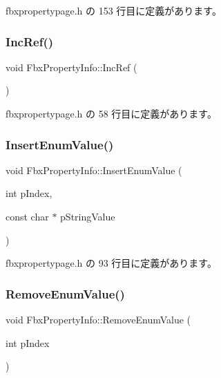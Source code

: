  fbxpropertypage.\+h の 153 行目に定義があります。

\mbox{\label{class_fbx_property_info_afa1a32d32b37e32e4b1ff4977b3ee9ab}} 
\subsubsection{\texorpdfstring{Inc\+Ref()}{IncRef()}}
{\footnotesize\ttfamily void Fbx\+Property\+Info\+::\+Inc\+Ref (\begin{DoxyParamCaption}{ }\end{DoxyParamCaption})\hspace{0.3cm}{\ttfamily [inline]}}



 fbxpropertypage.\+h の 58 行目に定義があります。

\mbox{\label{class_fbx_property_info_a65d9761825670a7b2a158685b10657d3}} 
\subsubsection{\texorpdfstring{Insert\+Enum\+Value()}{InsertEnumValue()}}
{\footnotesize\ttfamily void Fbx\+Property\+Info\+::\+Insert\+Enum\+Value (\begin{DoxyParamCaption}\item[{int}]{p\+Index,  }\item[{const char $\ast$}]{p\+String\+Value }\end{DoxyParamCaption})\hspace{0.3cm}{\ttfamily [inline]}}



 fbxpropertypage.\+h の 93 行目に定義があります。

\mbox{\label{class_fbx_property_info_ad76228d49b0ca38bc402f0e8fe2f3850}} 
\subsubsection{\texorpdfstring{Remove\+Enum\+Value()}{RemoveEnumValue()}}
{\footnotesize\ttfamily void Fbx\+Property\+Info\+::\+Remove\+Enum\+Value (\begin{DoxyParamCaption}\item[{int}]{p\+Index }\end{DoxyParamCaption})\hspace{0.3cm}{\ttfamily [inline]}}



